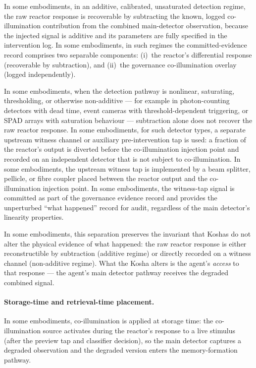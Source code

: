 \documentclass[a4paper,12pt]{article}
\begin{document}
In some embodiments, in an additive, calibrated, unsaturated
detection regime, the raw reactor response is recoverable by
subtracting the known, logged co-illumination contribution from the
combined main-detector observation, because the injected signal is
additive and its parameters are fully specified in the intervention
log. In some embodiments, in such regimes the committed-evidence
record comprises two separable components:
(i)~the reactor's differential response (recoverable by subtraction),
and (ii)~the governance co-illumination overlay (logged
independently).

In some embodiments, when the detection pathway is nonlinear,
saturating, thresholding, or otherwise non-additive --- for example
in photon-counting detectors with dead time, event cameras with
threshold-dependent triggering, or SPAD arrays with saturation
behaviour --- subtraction alone does not recover the raw reactor
response. In some embodiments, for such detector types, a separate
upstream witness channel or auxiliary pre-intervention tap is used:
a fraction of the reactor's output is diverted before the
co-illumination injection point and recorded on an independent
detector that is not subject to co-illumination. In some
embodiments, the upstream witness tap is implemented by a beam
splitter, pellicle, or fibre coupler placed between the reactor
output and the co-illumination injection point. In some embodiments,
the witness-tap signal is committed as part of the governance
evidence record and provides the unperturbed ``what happened'' record
for audit, regardless of the main detector's linearity properties.

In some embodiments, this separation preserves the invariant that
Koshas do not alter the physical evidence of what happened: the raw
reactor response is either reconstructible by subtraction (additive
regime) or directly recorded on a witness channel (non-additive
regime). What the Kosha alters is the agent's \emph{access} to that
response --- the agent's main detector pathway receives the degraded
combined signal.

\paragraph{Storage-time and retrieval-time placement.}
In some embodiments, co-illumination is applied at storage time: the
co-illumination source activates during the reactor's response to a
live stimulus (after the preview tap and classifier decision), so the
main detector captures a degraded observation and the degraded
version enters the memory-formation pathway.
\end{document}
